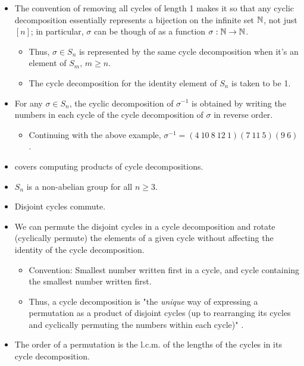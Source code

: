 \documentclass[../notes.tex]{subfiles}
\begin{document}
\begin{itemize}
    \item The convention of removing all cycles of length 1 makes it so that any cyclic decomposition essentially represents a bijection on the infinite set $\mathbb{N}$, not just $[n]$; in particular, $\sigma$ can be though of as a function $\sigma:\mathbb{N}\to\mathbb{N}$.
    \begin{itemize}
        \item Thus, $\sigma\in S_n$ is represented by the same cycle decomposition when it's an element of $S_m$, $m\geq n$.
        \item The cycle decomposition for the identity element of $S_n$ is taken to be 1.
    \end{itemize}
    \item For any $\sigma\in S_n$, the cyclic decomposition of $\sigma^{-1}$ is obtained by writing the numbers in each cycle of the cycle decomposition of $\sigma$ in reverse order.
    \begin{itemize}
        \item Continuing with the above example, $\sigma^{-1}=(4\ 10\ 8\ 12\ 1)(7\ 11\ 5)(9\ 6)$.
    \end{itemize}
    \item \textcite{bib:DummitFoote} covers computing products of cycle decompositions.
    \item $S_n$ is a non-abelian group for all $n\geq 3$.
    \item Disjoint cycles commute.
    \item We can permute the disjoint cycles in a cycle decomposition and rotate (cyclically permute) the elements of a given cycle without affecting the identity of the cycle decomposition.
    \begin{itemize}
        \item Convention: Smallest number written first in a cycle, and cycle containing the smallest number written first.
        \item Thus, a cycle decomposition is "the \emph{unique} way of expressing a permutation as a product of disjoint cycles (up to rearranging its cycles and cyclically permuting the numbers within each cycle)" \parencite[32]{bib:DummitFoote}.
    \end{itemize}
    \item The order of a permutation is the l.c.m. of the lengths of the cycles in its cycle decomposition.
\end{itemize}
\end{document}
